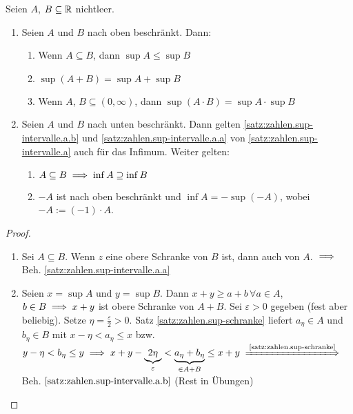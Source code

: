 \documentclass[12pt]{scrreprt}
\begin{document}
\begin{satz}\label{satz:zahlen.sup-intervalle}
Seien $A$, $B \subseteq \mathbb{R}$ nichtleer.
\begin{enumerate}
\item \label{satz:zahlen.sup-intervalle.a}
	Seien $A$ und $B$ nach oben beschränkt. Dann:
	\begin{enumerate}
	\item \label{satz:zahlen.sup-intervalle.a.a}
		Wenn $A \subseteq B$, dann $\sup A \le \sup B$
	\item \label{satz:zahlen.sup-intervalle.a.b}
		$\sup (A+B) = \sup A + \sup B$
	\item \label{satz:zahlen.sup-intervalle.a.c}
		Wenn $A$, $B \subseteq (0, \infty)$, dann $\sup(A\cdot B) = \sup A \cdot \sup B$
	\end{enumerate}
\item \label{satz:zahlen.sup-intervalle.b}
	Seien $A$ und $B$ nach unten beschränkt. Dann gelten
	\ref{satz:zahlen.sup-intervalle.a.b} und \ref{satz:zahlen.sup-intervalle.a.a} von \ref{satz:zahlen.sup-intervalle.a} auch für das Infimum. Weiter gelten:
	\begin{enumerate}
	\item \label{satz:zahlen.sup-intervalle.b.a}
	$A \subseteq B \implies \inf A \supseteq \inf B$
	\item \label{satz:zahlen.sup-intervalle.b.b}
	$-A$ ist nach oben beschränkt und $\inf A = -\sup(-A)$, wobei $-A:=(-1)\cdot A$.
	\end{enumerate}
\end{enumerate}
\end{satz}
\begin{proof}
\begin{enumerate}
\item Sei $A\subseteq B$. Wenn $z$ eine obere Schranke von $B$ ist, dann auch von $A$. $\implies$ Beh. \ref{satz:zahlen.sup-intervalle.a.a}
\item Seien $x=\sup A$ und $y = \sup B$. Dann $x+y\ge a+b\,\forall a \in A$, $b\in B \implies x+y $ ist obere Schranke von $A+B$. Sei $\varepsilon >0$
gegeben (fest aber beliebig). Setze  $\eta = \frac{\varepsilon}{2} > 0$. Satz \ref{satz:zahlen.sup-schranke} liefert $a_\eta \in A$ und 
$b_\eta \in B$ mit $x-\eta < a_\eta \le x$ bzw. $y-\eta < b_\eta \le y
\folgt x+y-\underbrace{2\eta}_\varepsilon < \underbrace{a_\eta + b_\eta}_{\in A+B} \le x+y \folgtnach{\ref{satz:zahlen.sup-schranke}}$ Beh. $\ref{satz:zahlen.sup-intervalle.a.b}$
(Rest in Übungen)
\end{enumerate}
\end{proof}
\end{document}
